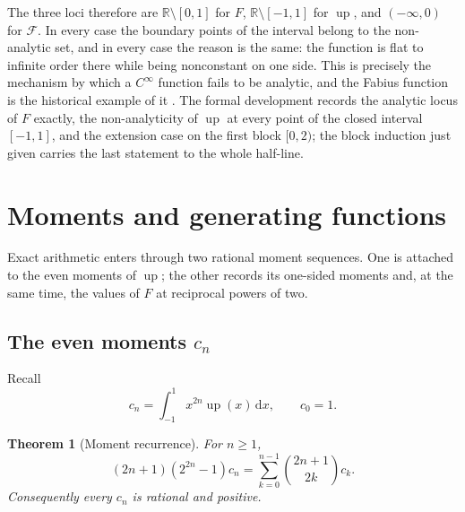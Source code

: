 \documentclass[11pt,oneside]{article}
\newtheorem{theorem}{Theorem}[section]
\theoremstyle{definition}
\theoremstyle{remark}
\newcommand{\R}{\mathbb R}
\newcommand{\Up}{\operatorname{up}}
\newcommand{\dd}{\,\mathrm d}
\begin{document}
The three loci therefore are $\R\setminus[0,1]$ for $F$, $\R\setminus[-1,1]$ for $\Up$, and
$(-\infty,0)$ for $\mathcal F$.  In every case the boundary points of the interval belong to
the non-analytic set, and in every case the reason is the same: the function is flat to
infinite order there while being nonconstant on one side.  This is precisely the mechanism by
which a $C^\infty$ function fails to be analytic, and the Fabius function is the historical
example of it \cite{fabius1966}.  The formal development records the analytic locus of $F$
exactly, the non-analyticity of $\Up$ at every point of the closed interval $[-1,1]$, and the
extension case on the first block $[0,2)$; the block induction just given carries the last
statement to the whole half-line.

\section{Moments and generating functions}
\label{sec:moments}

Exact arithmetic enters through two rational moment sequences.  One is attached to the even
moments of $\Up$; the other records its one-sided moments and, at the same time, the values of
$F$ at reciprocal powers of two.

\subsection{The even moments $c_n$}

Recall
\begin{equation*}
 c_n=\int_{-1}^{1}x^{2n}\Up(x)\dd x,
 \qquad c_0=1.
\end{equation*}

\begin{theorem}[Moment recurrence]
For $n\ge1$,
\begin{equation}
 (2n+1)(2^{2n}-1)c_n
 =\sum_{k=0}^{n-1}\binom{2n+1}{2k}c_k.                    \label{eq:c-recurrence}
\end{equation}
Consequently every $c_n$ is rational and positive.
\end{theorem}
\end{document}

